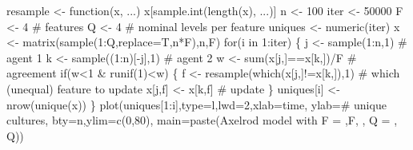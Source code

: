\documentclass[
  a4paper,
  DIV=11,
  numbers=noendperiod,
  oneside]{scrreprt}
\newenvironment{Shaded}{}{}
\newcommand{\AttributeTok}[1]{\textcolor[rgb]{0.84,0.23,0.29}{#1}}
\newcommand{\CommentTok}[1]{\textcolor[rgb]{0.42,0.45,0.49}{#1}}
\newcommand{\ControlFlowTok}[1]{\textcolor[rgb]{0.84,0.23,0.29}{#1}}
\newcommand{\DecValTok}[1]{\textcolor[rgb]{0.00,0.36,0.77}{#1}}
\newcommand{\FunctionTok}[1]{\textcolor[rgb]{0.44,0.26,0.76}{#1}}
\newcommand{\NormalTok}[1]{\textcolor[rgb]{0.14,0.16,0.18}{#1}}
\newcommand{\OtherTok}[1]{\textcolor[rgb]{0.44,0.26,0.76}{#1}}
\newcommand{\SpecialCharTok}[1]{\textcolor[rgb]{0.00,0.36,0.77}{#1}}
\newcommand{\StringTok}[1]{\textcolor[rgb]{0.01,0.18,0.38}{#1}}
\begin{document}
\begin{Shaded}
\begin{Highlighting}[]
\NormalTok{resample }\OtherTok{\textless{}{-}} \ControlFlowTok{function}\NormalTok{(x, ...) x[}\FunctionTok{sample.int}\NormalTok{(}\FunctionTok{length}\NormalTok{(x), ...)]}
\NormalTok{n }\OtherTok{\textless{}{-}} \DecValTok{100}
\NormalTok{iter }\OtherTok{\textless{}{-}} \DecValTok{50000}
\NormalTok{F }\OtherTok{\textless{}{-}} \DecValTok{4} \CommentTok{\# features}
\NormalTok{Q }\OtherTok{\textless{}{-}} \DecValTok{4} \CommentTok{\# nominal levels per feature}
\NormalTok{uniques }\OtherTok{\textless{}{-}} \FunctionTok{numeric}\NormalTok{(iter)}
\NormalTok{x }\OtherTok{\textless{}{-}} \FunctionTok{matrix}\NormalTok{(}\FunctionTok{sample}\NormalTok{(}\DecValTok{1}\SpecialCharTok{:}\NormalTok{Q,}\AttributeTok{replace=}\NormalTok{T,n}\SpecialCharTok{*}\NormalTok{F),n,F)}
\ControlFlowTok{for}\NormalTok{(i }\ControlFlowTok{in} \DecValTok{1}\SpecialCharTok{:}\NormalTok{iter)}
\NormalTok{\{}
\NormalTok{  j }\OtherTok{\textless{}{-}} \FunctionTok{sample}\NormalTok{(}\DecValTok{1}\SpecialCharTok{:}\NormalTok{n,}\DecValTok{1}\NormalTok{)       }\CommentTok{\# agent 1}
\NormalTok{  k }\OtherTok{\textless{}{-}} \FunctionTok{sample}\NormalTok{((}\DecValTok{1}\SpecialCharTok{:}\NormalTok{n)[}\SpecialCharTok{{-}}\NormalTok{j],}\DecValTok{1}\NormalTok{) }\CommentTok{\# agent 2}
\NormalTok{  w }\OtherTok{\textless{}{-}} \FunctionTok{sum}\NormalTok{(x[j,]}\SpecialCharTok{==}\NormalTok{x[k,])}\SpecialCharTok{/}\NormalTok{F }\CommentTok{\# agreement}
  \ControlFlowTok{if}\NormalTok{(w}\SpecialCharTok{\textless{}}\DecValTok{1} \SpecialCharTok{\&} \FunctionTok{runif}\NormalTok{(}\DecValTok{1}\NormalTok{)}\SpecialCharTok{\textless{}}\NormalTok{w) \{}
\NormalTok{    f }\OtherTok{\textless{}{-}} \FunctionTok{resample}\NormalTok{(}\FunctionTok{which}\NormalTok{(x[j,]}\SpecialCharTok{!=}\NormalTok{x[k,]),}\DecValTok{1}\NormalTok{) }
    \CommentTok{\# which (unequal) feature to update}
\NormalTok{    x[j,f] }\OtherTok{\textless{}{-}}\NormalTok{ x[k,f] }\CommentTok{\# update}
\NormalTok{    \}}
\NormalTok{  uniques[i] }\OtherTok{\textless{}{-}} \FunctionTok{nrow}\NormalTok{(}\FunctionTok{unique}\NormalTok{(x))}
\NormalTok{\}}
\FunctionTok{plot}\NormalTok{(uniques[}\DecValTok{1}\SpecialCharTok{:}\NormalTok{i],}\AttributeTok{type=}\StringTok{\textquotesingle{}l\textquotesingle{}}\NormalTok{,}\AttributeTok{lwd=}\DecValTok{2}\NormalTok{,}\AttributeTok{xlab=}\StringTok{\textquotesingle{}time\textquotesingle{}}\NormalTok{,}
     \AttributeTok{ylab=}\StringTok{\textquotesingle{}\# unique cultures\textquotesingle{}}\NormalTok{, }\AttributeTok{bty=}\StringTok{\textquotesingle{}n\textquotesingle{}}\NormalTok{,}\AttributeTok{ylim=}\FunctionTok{c}\NormalTok{(}\DecValTok{0}\NormalTok{,}\DecValTok{80}\NormalTok{),}
     \AttributeTok{main=}\FunctionTok{paste}\NormalTok{(}\StringTok{\textquotesingle{}Axelrod model with F = \textquotesingle{}}\NormalTok{,F, }\StringTok{\textquotesingle{}, Q = \textquotesingle{}}\NormalTok{, Q))}
\end{Highlighting}
\end{Shaded}
\end{document}
